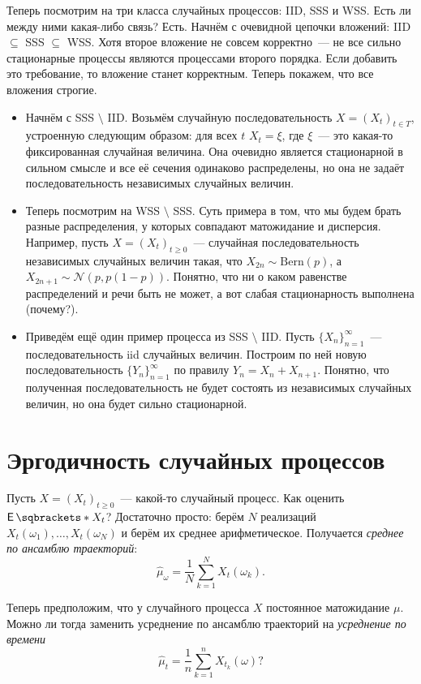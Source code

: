 Теперь посмотрим на три класса случайных процессов: IID, SSS и WSS. Есть ли 
между ними какая-либо связь? Есть. Начнём с очевидной цепочки вложений: IID 
\(\subseteq\) SSS \(\subseteq\) WSS. Хотя второе вложение не совсем 
корректно~--- не все сильно стационарные процессы являются процессами второго 
порядка. Если добавить это требование, то вложение станет корректным. Теперь 
покажем, что все вложения строгие.
\begin{itemize}
	\item Начнём с SSS \(\setminus\) IID. Возьмём случайную последовательность 
	\(X = (X_{t})_{t \in T}\), устроенную следующим образом: для всех \(t\) 
	\(X_{t} = \xi\), где \(\xi\)~--- это какая-то фиксированная случайная 
	величина. Она очевидно является стационарной в сильном смысле и все её 
	сечения одинаково распределены, но она не задаёт последовательность 
	независимых случайных величин.
	\item Теперь посмотрим на WSS \(\setminus\) SSS. Суть примера в том, что мы 
	будем брать разные распределения, у которых совпадают матожидание и 
	дисперсия. Например, пусть \(X = (X_{t})_{t \geq 0}\)~--- случайная 
	последовательность независимых случайных величин такая, что \(X_{2n} \sim 
	\mathrm{Bern}(p)\), а \(X_{2n + 1} \sim \mathcal{N}(p, p(1 - p))\). 
	Понятно, что ни о каком равенстве распределений и речи быть не может, а вот 
	слабая стационарность выполнена (почему?).
	\item Приведём ещё один пример процесса из SSS \(\setminus\) IID. Пусть 
	\(\{X_{n}\}_{n = 1}^{\infty}\)~--- последовательность iid случайных 
	величин. Построим по ней новую последовательность \(\{Y_{n}\}_{n = 
	1}^{\infty}\) по правилу \(Y_{n} = X_{n} + X_{n + 1}\). Понятно, что 
	полученная последовательность не будет состоять из независимых случайных 
	величин, но она будет сильно стационарной.
\end{itemize}

\section{Эргодичность случайных процессов}
Пусть \(X = (X_{t})_{t \geq 0}\)~--- какой-то случайный процесс. Как оценить 
\(\E{X_{t}}\)? Достаточно просто: берём \(N\) реализаций \(X_{t}(\omega_{1}), 
\ldots, X_{t}(\omega_{N})\) и берём их среднее арифметическое. Получается 
\emph{среднее по ансамблю траекторий}:
\[
	\hat{\mu}_{\omega} = \frac{1}{N}\sum_{k = 1}^{N} X_{t}(\omega_{k}).
\]

Теперь предположим, что у случайного процесса \(X\) постоянное матожидание 
\(\mu\). Можно ли тогда заменить усреднение по ансамблю траекторий на 
\emph{усреднение по времени}
\[
	\hat{\mu}_{t} = \frac{1}{n}\sum_{k = 1}^{n} X_{t_{k}}(\omega)?
\]

